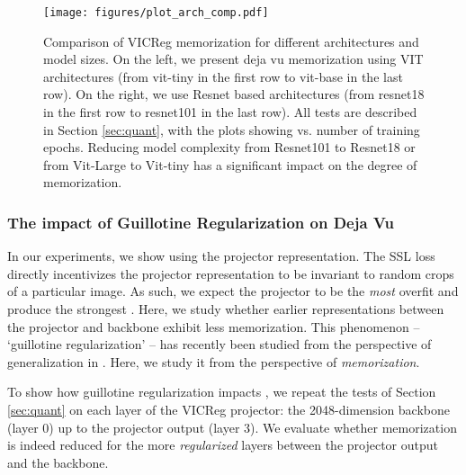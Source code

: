 \begin{figure}[ht]
\captionsetup[subfigure]{font=scriptsize,labelfont=scriptsize}
     \centering
     \texttt{[image: figures/plot\_arch\_comp.pdf]}
     \caption{Comparison of VICReg \dejavu memorization for different architectures and model sizes. On the left, we present deja vu memorization using VIT architectures (from vit-tiny in the first row to vit-base in the last row). On the right, we use Resnet based architectures (from resnet18 in the first row to resnet101 in the last row). All tests are described in Section \ref{sec:quant}, with the plots showing \dejavu vs. number of training epochs. Reducing model complexity from Resnet101 to Resnet18 or from Vit-Large to Vit-tiny has a significant impact on the degree of memorization.}
\label{fig:rn101 v. rn50}
\end{figure}

\clearpage

\subsubsection{The impact of Guillotine Regularization on Deja Vu}
\label{sec:guillotine}
In our experiments, we show \dejavu using the projector representation. The SSL loss directly incentivizes the projector representation to be invariant to random crops of a particular image. As such, we expect the projector to be the \emph{most} overfit and produce the strongest \dejavu. Here, we study whether earlier representations between the projector and backbone exhibit less \dejavu memorization. This phenomenon -- `guillotine regularization' -- has recently been studied from the perspective of generalization in \citet{Guillotine}. Here, we study it from the perspective of \emph{memorization}. 

To show how guillotine regularization impacts \dejavu, we repeat the tests of Section \ref{sec:quant} on each layer of the VICReg projector: the 2048-dimension backbone (layer 0) up to the projector output (layer 3). We evaluate whether memorization is indeed reduced for the more \emph{regularized} layers between the projector output and the backbone. 

